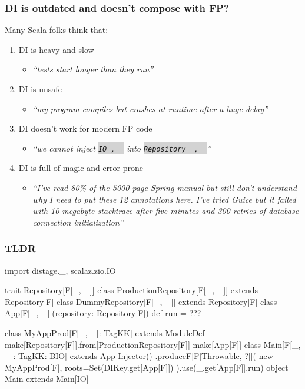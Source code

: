 \documentclass[usenames,dvipsnames]{beamer}
\newcommand{\code}[1]{\colorbox{lightgray}{\texttt{#1}}}
\begin{document}
\begin{frame}
\frametitle{DI is outdated and doesn't compose with FP?}
  Many Scala folks think that:
  \begin{enumerate}
  \item DI is heavy and slow
  \begin{itemize}
    \item \textit{``tests start longer than they run''}
  \end{itemize}
  \item DI is unsafe
  \begin{itemize}
    \item \textit{``my program compiles but crashes at runtime after a huge delay''}
  \end{itemize}
  \item DI doesn't work for modern FP code
  \begin{itemize}
    \item \textit{``we cannot inject \code{IO\lbrack\_, \_\rbrack} into \code{Repository\lbrack\_\lbrack\_, \_\rbrack\rbrack}''}
  \end{itemize}
  \item DI is full of magic and error-prone
  \begin{itemize}
    \item \textit{``I've read 80\% of the 5000-page Spring manual but still don't understand why I need to put these 12 annotations here.
    I've tried Guice but it failed with 10-megabyte stacktrace after five minutes and 300 retries of database connection initialization''}
  \end{itemize}
  \end{enumerate}
\end{frame}


\begin{frame}[fragile]
\frametitle{TLDR}
  \begin{scalacode}
import distage._, scalaz.zio.IO

trait Repository[F[_, _]]
class ProductionRepository[F[_, _]] extends Repository[F]
class DummyRepository[F[_, _]] extends Repository[F]
class App[F[_, _]](repository: Repository[F]) { def run = ??? }

class MyAppProd[F[_, _]: TagKK] extends ModuleDef {
  make[Repository[F]].from[ProductionRepository[F]]
  make[App[F]]
}
class Main[F[_, _]: TagKK: BIO] extends App {
  Injector()
    .produceF[F[Throwable, ?]](
      new MyAppProd[F], roots=Set(DIKey.get[App[F]])
    ).use(_.get[App[F]].run)
}
object Main extends Main[IO]
  \end{scalacode}
\end{frame}
\end{document}
